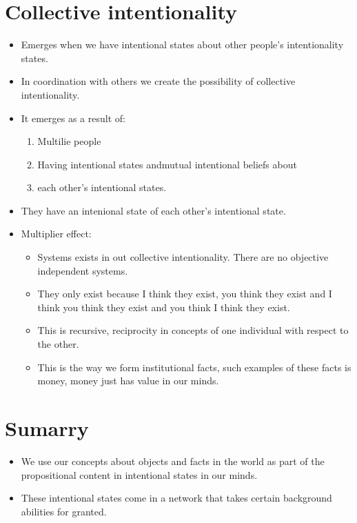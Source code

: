 \section{Collective intentionality}
\begin{itemize}
    \item Emerges when we have intentional states about other people's intentionality states.
    \item In coordination with others we create the possibility of collective intentionality.
    \item It emerges as a result of:
        \begin{enumerate}
            \item Multilie people 
            \item Having intentional states andmutual intentional beliefs about 
            \item each other's intentional states.
        \end{enumerate}
    
    \item They have an intenional state of each other's intentional state.
    \item Multiplier effect: 
        \begin{itemize}
            \item Systems exists in out collective intentionality. There are no objective independent systems.
            \item They only exist because I think they exist, you think they exist and I think you think they exist and you think I think they exist.
            \item This is recursive, reciprocity in concepts of one individual with respect to the other.
            \item This is the way we form institutional facts, such examples of these facts is money, money just has value in our minds. 
        \end{itemize}
\end{itemize}


\section{Sumarry}
\begin{itemize}
    \item We use our concepts about objects and facts in the world as part of the propositional content in intentional states in our minds.
    \item These intentional states come in a network that takes certain background abilities for granted.
\end{itemize}



